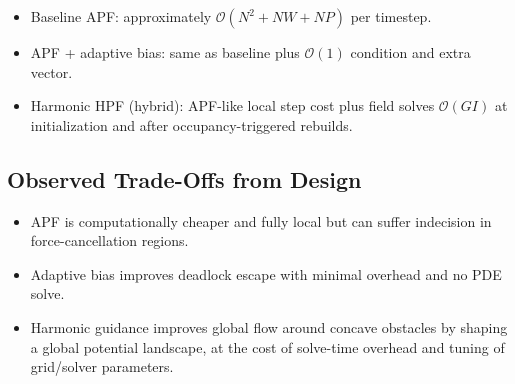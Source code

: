 \documentclass[11pt,a4paper]{article}
\begin{document}
\begin{itemize}[leftmargin=1.2em]
    \item Baseline APF: approximately $\mathcal{O}(N^2 + NW + NP)$ per timestep.
    \item APF + adaptive bias: same as baseline plus $\mathcal{O}(1)$ condition and extra vector.
    \item Harmonic HPF (hybrid): APF-like local step cost plus field solves $\mathcal{O}(GI)$ at initialization and after occupancy-triggered rebuilds.
\end{itemize}

\subsection{Observed Trade-Offs from Design}
\begin{itemize}[leftmargin=1.2em]
    \item APF is computationally cheaper and fully local but can suffer indecision in force-cancellation regions.
    \item Adaptive bias improves deadlock escape with minimal overhead and no PDE solve.
    \item Harmonic guidance improves global flow around concave obstacles by shaping a global potential landscape, at the cost of solve-time overhead and tuning of grid/solver parameters.
\end{itemize}
\end{document}
